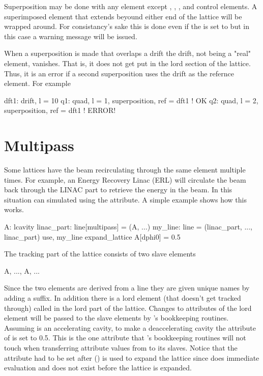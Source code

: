 Superposition may be done with any element except ,
, , and  control elements. A superimposed element that
extends beyound either end of the lattice will be wrapped around. For consistancy's sake
this is done even if the  is set to  but in this case
a warning message will be issued.

When a superposition is made that overlaps a drift the drift, not being a "real" 
element, vanishes. That is, it does not get put in the lord section of the lattice.
Thus, it is an error if a second superposition uses the drift as the refernce element.
For example
\begin{example}
  dft1: drift, l = 10
  q1: quad, l = 1, superposition, ref = dft1   ! OK 
  q2: quad, l = 2, superposition, ref = dft1   ! ERROR! 
\end{example}

\section{Multipass}
\label{s:multipass}

Some lattices have the beam recirculating through the same element
multiple times. For example, an Energy Recovery Linac (ERL) will
circulate the beam back through the LINAC part to retrieve the energy
in the beam. In \bmad this situation can simulated using the
 attribute. A simple example shows how this works.
\begin{example}
  A: lcavity
  linac_part: line[multipass] = (A, ...)
  my_line: line = (linac_part, ..., linac_part)
  use, my_line
  expand_lattice
  A[dphi0] = 0.5
\end{example}
The tracking part of the lattice consists of two slave elements
\begin{example}
  A, ..., A, ...
\end{example}
Since the two elements are derived from a  line they are
given unique names by adding a  suffix. In addition there is
a lord element (that doesn't get tracked through) called  in the
lord part of the lattice. Changes to attributes of the lord 
element will be passed to the slave elements by \bmad's bookkeeping
routines. Assuming  is an accelerating cavity, to make
 a deaccelerating cavity the  attribute of
 is set to 0.5. This is the one attribute that \bmad's
bookkeeping routines will not touch when transferring attribute values
from  to its slaves. Notice that the  attribute had to
be set after  ()
is used to expand the lattice since
\bmad does immediate evaluation and  does not exist before
the lattice is expanded.

